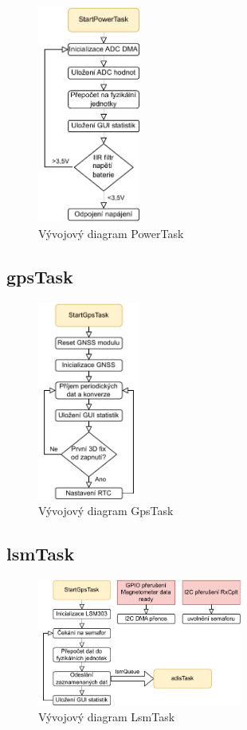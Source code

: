 \begin{figure}[h]
    \centering
    \includegraphics[width=0.3\textwidth]{obrazky/PowerTask}
    \caption{Vývojový diagram PowerTask}
\end{figure}
\subsection{gpsTask}
\begin{figure}[h]
    \centering
    \includegraphics[width=0.3\textwidth]{obrazky/GpsTask}
    \caption{Vývojový diagram GpsTask}
\end{figure}
\subsection{lsmTask}
\begin{figure}[h]
    \centering
    \includegraphics[width=0.6\textwidth]{obrazky/LsmTask}
    \caption{Vývojový diagram LsmTask}
\end{figure}
